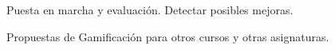 \documentclass[a4paper, 12pt]{book}
\begin{document}
Puesta en marcha y evaluación. Detectar posibles mejoras.

Propuestas de Gamificación para otros cursos y otras asignaturas.




\cleardoublepage
\appendix



\cleardoublepage



\printindex
\end{document}
